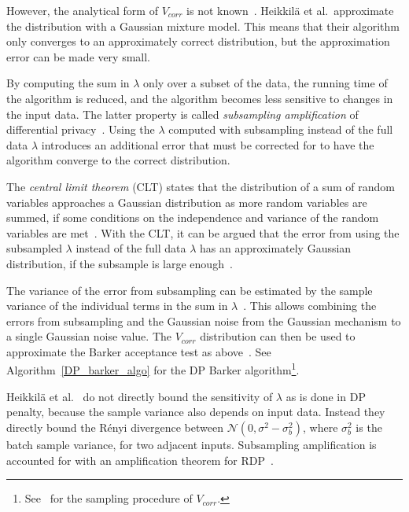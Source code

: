 \documentclass[english,twoside,openright]{HYgraduMLDS}
\newcommand{\caln}{{\mathcal{N}}}
\begin{document}
However, the analytical form of \(V_{corr}\) is not known~\cite{HeikkilaJDH19}.
Heikkilä et al.\  approximate the distribution with a Gaussian mixture model.
This means that their 
algorithm only converges to an approximately correct distribution, but the 
approximation error can be made very small.

By computing the sum in \(\lambda\) only over a subset of the data, the
running time of the algorithm is reduced, and the algorithm becomes less
sensitive to changes in the input data.
The latter property is called \emph{subsampling amplification}
of differential privacy~\cite{WangBK19}. Using the \(\lambda\) computed 
with subsampling instead of the full data \(\lambda\) introduces an additional 
error that must be corrected for to have the algorithm converge to the correct 
distribution. 

The \emph{central limit theorem} (CLT) states that the distribution of a sum 
of random variables approaches a Gaussian distribution as more random variables 
are summed, if some conditions on the independence and variance of the random 
variables are met~\cite{SPC17}. With the CLT, it can be argued
that the error from 
using the subsampled \(\lambda\) instead of the full data \(\lambda\) has an 
approximately Gaussian distribution, if the subsample is large 
enough~\cite{SPC17}.

The variance of the error from subsampling can 
be estimated by the sample variance of the individual terms in the sum in 
\(\lambda\)~\cite{SPC17}. This allows combining the errors from subsampling and the
Gaussian noise from the Gaussian mechanism to a single Gaussian noise value.
The \(V_{corr}\) distribution can then be used to approximate the Barker acceptance 
test as above~\cite{HeikkilaJDH19}. See Algorithm~\ref{DP_barker_algo} for the DP Barker
algorithm\footnote{
    See~\cite{HeikkilaJDH19} for the sampling procedure of \(V_{corr}\).
}.

Heikkilä et al.~\cite{HeikkilaJDH19} do not directly bound the sensitivity
of \(\lambda\) as is done in DP penalty, because the sample variance also 
depends on input data. Instead they directly bound the Rényi divergence 
between \(\caln(0, \sigma^2 - \sigma^2_b)\), where \(\sigma^2_b\) is the 
batch sample variance, for two adjacent inputs. Subsampling amplification 
is accounted for with an amplification theorem for RDP~\cite{WangBK19}.
\end{document}
